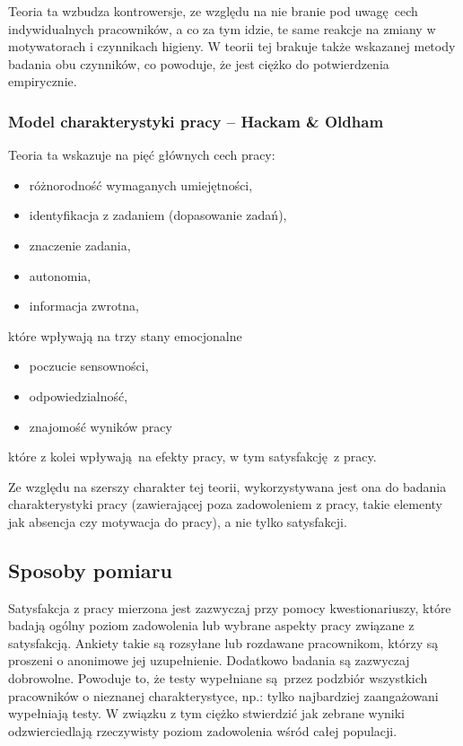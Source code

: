 Teoria ta wzbudza kontrowersje, ze względu na nie branie pod uwagę cech indywidualnych pracowników, a co za tym idzie, te same reakcje na zmiany w motywatorach i czynnikach higieny. W teorii tej brakuje także wskazanej metody badania obu czynników, co powoduje, że jest ciężko do potwierdzenia empirycznie.

\subsubsection{Model charakterystyki pracy -- Hackam \& Oldham}
Teoria ta wskazuje na pięć głównych cech pracy:
\begin{itemize}
\item różnorodność wymaganych umiejętności,
\item identyfikacja z zadaniem (dopasowanie zadań),
\item znaczenie zadania,
\item autonomia,
\item informacja zwrotna,
\end{itemize}
które wpływają na trzy stany emocjonalne
\begin{itemize}
\item poczucie sensowności,
\item odpowiedzialność,
\item znajomość wyników pracy
\end{itemize}
które z kolei wpływają na efekty pracy, w tym satysfakcję z pracy. 

Ze względu na szerszy charakter tej teorii, wykorzystywana jest ona do badania charakterystyki pracy (zawierającej poza zadowoleniem z pracy, takie elementy jak absencja czy motywacja do pracy), a nie tylko satysfakcji.

\subsection{Sposoby pomiaru}
Satysfakcja z pracy mierzona jest zazwyczaj przy pomocy kwestionariuszy, które badają ogólny poziom zadowolenia lub wybrane aspekty pracy związane z satysfakcją. Ankiety takie są rozsyłane lub rozdawane pracownikom, którzy są proszeni o anonimowe jej uzupełnienie. Dodatkowo badania są zazwyczaj dobrowolne. Powoduje to, że testy wypełniane są przez podzbiór wszystkich pracowników o nieznanej charakterystyce, np.: tylko najbardziej zaangażowani wypełniają testy. W
związku z tym ciężko stwierdzić jak zebrane wyniki odzwierciedlają rzeczywisty poziom zadowolenia wśród całej populacji.

